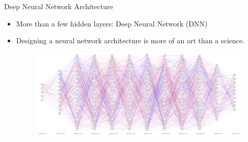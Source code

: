 \documentclass[serif, aspectratio=169]{beamer}
\begin{document}
\begin{frame}[t]{Deep Neural Network Architecture}
\begin{itemize}
    \item More than a few hidden layers: Deep Neural Network (DNN)
    \item Designing a neural network architecture is more of an art than a science.
        \begin{figure}[bh]
            \includegraphics[keepaspectratio, scale=0.3]{pic/3/huge-nn.png}
        \end{figure}
\end{itemize}
\end{frame}
\end{document}
